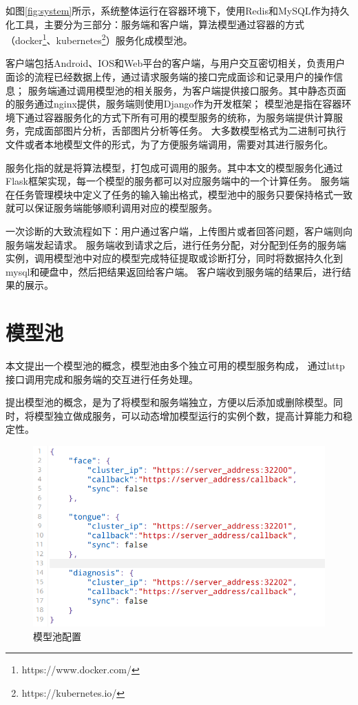 如图\ref{fig:system}所示，系统整体运行在容器环境下，使用Redis和MySQL作为持久化工具，主要分为三部分：服务端和客户端，算法模型通过容器的方式（docker\footnote{https://www.docker.com/}、kubernetes\footnote{https://kubernetes.io/}）服务化成模型池。

客户端包括Android、IOS和Web平台的客户端，与用户交互密切相关，负责用户面诊的流程已经数据上传，通过请求服务端的接口完成面诊和记录用户的操作信息；
服务端通过调用模型池的相关服务，为客户端提供接口服务。其中静态页面的服务通过nginx提供，服务端则使用Django作为开发框架；
模型池是指在容器环境下通过容器服务化的方式下所有可用的模型服务的统称，为服务端提供计算服务，完成面部图片分析，舌部图片分析等任务。
大多数模型格式为二进制可执行文件或者本地模型文件的形式，为了方便服务端调用，需要对其进行服务化。

服务化指的就是将算法模型，打包成可调用的服务。其中本文的模型服务化通过Flask框架实现，每一个模型的服务都可以对应服务端中的一个计算任务。
服务端在任务管理模块中定义了任务的输入输出格式，模型池中的服务只要保持格式一致就可以保证服务端能够顺利调用对应的模型服务。

一次诊断的大致流程如下：用户通过客户端，上传图片或者回答问题，客户端则向服务端发起请求。
服务端收到请求之后，进行任务分配，对分配到任务的服务端实例，调用模型池中对应的模型完成特征提取或诊断打分，同时将数据持久化到mysql和硬盘中，然后把结果返回给客户端。
客户端收到服务端的结果后，进行结果的展示。

\section{模型池}
本文提出一个模型池的概念，模型池由多个独立可用的模型服务构成， 通过http 接口调用完成和服务端的交互进行任务处理。

提出模型池的概念，是为了将模型和服务端独立，方便以后添加或删除模型。同时，将模型独立做成服务，可以动态增加模型运行的实例个数，提高计算能力和稳定性。

\begin{figure}[h]
    \centering
    \includegraphics[width=15cm]{images/services.png}
    \caption{模型池配置}
    \label{fig:services}
\end{figure}

